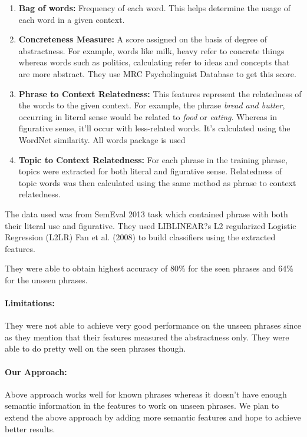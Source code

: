 \documentclass[11pt] {article}
\begin{document}
\begin{enumerate}
\item \textbf{Bag of words: } Frequency of each word. This helps determine the usage of each word in a given context.
\item \textbf{Concreteness Measure: } A score assigned on the basis of degree of abstractness. For example, words like milk, heavy refer to concrete things whereas words such as politics, calculating refer to ideas and concepts that are more abstract. They use MRC Psycholinguist Database to get this score.
\item \textbf{Phrase to Context Relatedness:} This features represent the relatedness of the words to the given context. For example, the phrase \emph{bread and butter}, occurring in literal sense would be related to \emph{food} or \emph{eating}. Whereas in figurative sense, it'll occur with less-related words. It's calculated using the WordNet similarity. All words package is used 
\item \textbf{Topic to Context Relatedness:} For each phrase in the training phrase, topics were extracted for both literal and figurative sense. Relatedness of topic words was then calculated using the same method as phrase to context relatedness.
\end{enumerate}

\noindent The data used was from SemEval 2013 task which contained phrase with both their literal use and figurative. They used LIBLINEAR?s L2 regularized Logistic Regression (L2LR)
Fan et al. (2008) to build classifiers using the extracted features.

\noindent They were able to obtain highest accuracy of 80\% for the seen phrases and 64\% for the unseen phrases. 

\paragraph{Limitations:} They were not able to achieve very good performance on the unseen phrases since as they mention that their features measured the abstractness only. They were able to do pretty well on the seen phrases though.

\paragraph{Our Approach:} Above approach works well for known phrases whereas it doesn't have enough semantic information in the features to work on unseen phrases. We plan to extend the above approach by adding more semantic features and hope to achieve better results.
\end{document}
